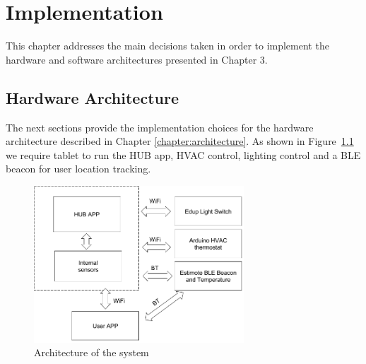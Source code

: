 \chapter{Implementation}
\label{chapter:implementation}

This chapter addresses the main decisions taken in order to implement the hardware and software architectures presented in Chapter 3.


\section{Hardware Architecture}


The next sections provide the implementation choices for the hardware architecture described in Chapter \ref{chapter:architecture}. As shown in Figure~\ref{architecture_system} we require tablet to run the HUB app, HVAC control, lighting control and a \ac{BLE} beacon for user location tracking.



\begin{figure}[h]
\centering
\includegraphics[width=0.7\textwidth]{Figures/top_view}
\caption{Architecture of the system}
\label{architecture_system}
\end{figure}






